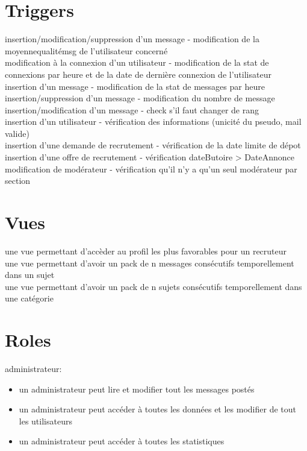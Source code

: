\documentclass{report}
\begin{document}
\section{Triggers}
insertion/modification/suppression d'un message - modification de la moyennequalitémsg de l'utilisateur concerné\\
modification à la connexion d'un utilisateur - modification de la stat de connexions par heure et de la date de dernière connexion de l'utilisateur\\
insertion d'un message - modification de la stat de messages par heure\\
insertion/suppression d'un message - modification du nombre de message\\
insertion/modification d'un message - check s'il faut changer de rang\\
insertion d'un utilisateur - vérification des informations (unicité du pseudo, mail valide)\\
insertion d'une demande de recrutement - vérification de la date limite de dépot\\
insertion d'une offre de recrutement - vérification dateButoire > DateAnnonce\\
modification de modérateur - vérification qu'il n'y a qu'un seul modérateur par section\\
\section{Vues}
une vue permettant d'accèder au profil les plus favorables pour un recruteur\\
une vue permettant d'avoir un pack de n messages consécutifs temporellement dans un sujet\\
une vue permettant d'avoir un pack de n sujets consécutifs temporellement dans une catégorie

\section{Roles}
administrateur:
\begin{itemize}
	\item un administrateur peut lire et modifier tout les messages postés
	\item un administrateur peut accéder à toutes les données et  les modifier de tout les utilisateurs
	\item un administrateur peut accéder à toutes les statistiques\\
\end{itemize}
\end{document}
